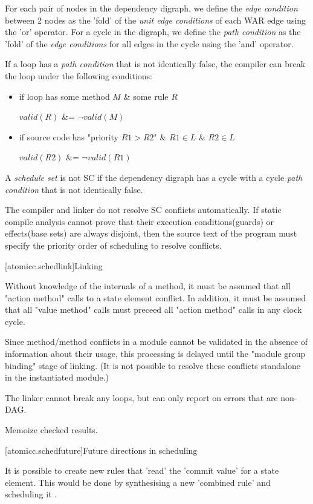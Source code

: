 For each pair of nodes in the dependency digraph, we define the \textit{edge condition}
between 2 nodes as the 'fold' of the \textit{unit edge conditions} of each WAR edge
using the 'or' operator.
For a cycle in the digraph, we define the \textit{path condition}
as the 'fold' of the \textit{edge conditions} for all edges in the cycle using the 'and' operator.

If a loop has a \textit{path condition} that is not identically false,
the compiler can break the loop under the following conditions:
\begin{itemize}
\item if loop has some method $M$ \& some rule $R$

              $valid(R)$ \&= $\neg valid(M)$
\item if source code has "priority $R1 > R2$" \& $R1 \in L$ \& $R2 \in L$

              $valid(R2)$ \&= $\neg valid(R1)$
\end{itemize}
A \textit{schedule set} is not SC if the dependency digraph has a cycle
with a cycle \textit{path condition} that is not identically false.

The compiler and linker do not resolve SC conflicts automatically.
If static compile analysis cannot prove that their execution conditions(guards) or
effects(base sets) are always disjoint,
then the source text of the program must specify the priority order of scheduling
to resolve conflicts.

[atomicc.schedlink]{Linking}

Without knowledge of the internals of a method, it must be assumed that all "action method"
calls to a state element conflict.  In addition, it must be assumed that all "value method" calls
must preceed all "action method" calls in any clock cycle.

Since method/method conflicts in a module cannot be validated in the absence of
information about their usage, this processing is delayed until the "module group binding"
stage of linking.
(It is not possible to resolve these conflicts standalone in the instantiated module.)

The linker cannot break any loops, but can only report on errors that are non-DAG.

Memoize checked results.

[atomicc.schedfuture]{Future directions in scheduling}

It is possible to create new rules that 'read' the 'commit value' for a state element.
This would be done by synthesising a new 'combined rule' and scheduling it \cite{Rosenband:Thesis}.

